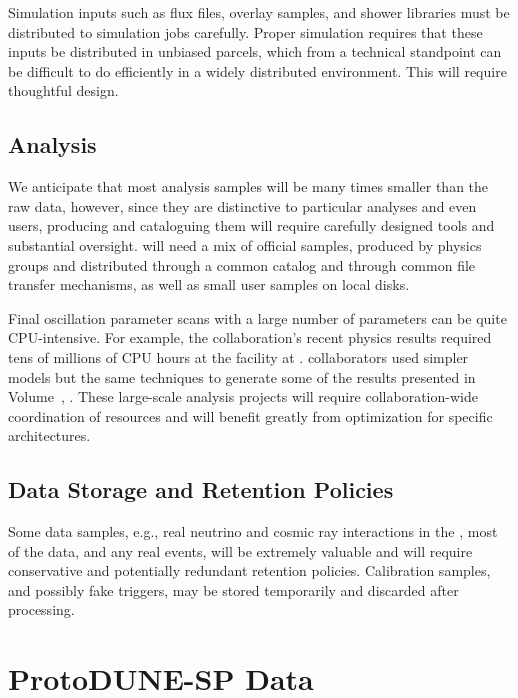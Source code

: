 Simulation inputs such as flux files, overlay samples, and shower libraries %
must be distributed to simulation jobs carefully.   Proper simulation requires that these inputs be distributed in unbiased parcels, which from a technical standpoint can be difficult to do efficiently in a widely distributed environment. This will require thoughtful design. 

\subsection{Analysis}
\label{sec:exec-comp-anal}

We anticipate that most analysis samples will be many times smaller than the raw data, however, since they are  
distinctive to particular analyses and even users,  producing and cataloguing them will require carefully designed tools and substantial oversight. 
 will need a mix of official samples, produced by physics groups and distributed through a common catalog and through common file transfer mechanisms, as well as small user samples on local disks. 

Final oscillation parameter scans with a large number of  
parameters can be quite CPU-intensive.  For example, the  collaboration's recent physics results required tens of millions of  CPU hours at the  
facility at .  collaborators used simpler models but the same techniques to generate some of the results presented in Volume~\volnumberphysics{}, \voltitlephysics{}. These large-scale analysis projects will require collaboration-wide coordination of resources and will benefit greatly from optimization for specific architectures.

\subsection{Data Storage and Retention Policies}
\label{sec:exec-comp-dsrp}


Some data samples, e.g., real neutrino and cosmic ray interactions in the , most of the  data, and any real  events, will be extremely valuable and will require conservative and potentially redundant retention policies.    Calibration samples, and possibly fake  triggers, may be stored temporarily and discarded after processing. 



\section{ProtoDUNE-SP Data}
\label{sec:exec-comp-proto-SP}

